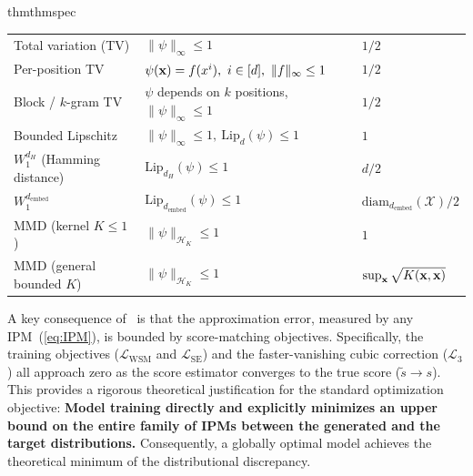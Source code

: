 \documentclass{article} %
\def\eqref#1{equation~\ref{#1}}
\newcommand{\bfx}{{\bf x}}
\newcommand{\LWSM}{\mathcal{L}_{\mathrm{WSM}}}
\newcommand{\LSE}{\mathcal{L}_{\mathrm{SE}}}
\renewcommand{\eqref}[1]{\textup{(\ref{#1})}}
\newcommand{\LThree}{\mathcal{L}_{3}}
\newcommand{\diam}{\mathrm{diam}}
\newcommand{\Lip}{\mathrm{Lip}}
\begin{document}
\begin{restatable}{thm}{thmspec}
\begin{table}[!ht]
\begin{tabular}{lll}
\midrule
Total variation (TV) & $\|\psi\|_\infty \le 1$ & $1/2$ \\
Per-position TV & $\psi(\bfx) = f(x^i),\ i \in [d], \ \|f\|_\infty \le 1$ & $1/2$ \\
Block / $k$-gram TV & $\psi$ depends on $k$ positions,\ $\|\psi\|_\infty \le 1$ & $1/2$ \\
Bounded Lipschitz & $\|\psi\|_\infty \le 1,\ \Lip_d(\psi) \le 1$ & $1$ \\
$W_1^{d_H}$ (Hamming distance) & $\Lip_{d_H}(\psi) \le 1$ & $d/2$ \\
$W_1^{d_{\mathrm{embed}}}$ & $\Lip_{d_{\mathrm{embed}}}(\psi) \le 1$ & $\diam_{d_{\mathrm{embed}}}(\mathcal{X})/2$ \\
MMD (kernel $K \le 1$) & $\|\psi\|_{\mathcal{H}_K} \le 1$ & $1$ \\
MMD (general bounded $K$) & $\|\psi\|_{\mathcal{H}_K} \le 1$ & $\sup_\bfx \sqrt{K(\bfx, \bfx)}$ \\
\bottomrule
\end{tabular}
\end{table}
\end{restatable}

A key consequence of~ is that the approximation error, measured by any IPM~\eqref{eq:IPM}, is bounded by score-matching objectives. Specifically, the training objectives ($\LWSM$ and $\LSE$) and the faster-vanishing cubic correction ($\LThree$) all approach zero as the score estimator converges to the true score ($\tilde{s} \to s$). This provides a rigorous theoretical justification for the standard optimization objective: \textbf{Model training directly and explicitly minimizes an upper bound on the entire family of IPMs between the generated and the target distributions.} Consequently, a globally optimal model achieves the theoretical minimum of the distributional discrepancy. 
\end{document}
